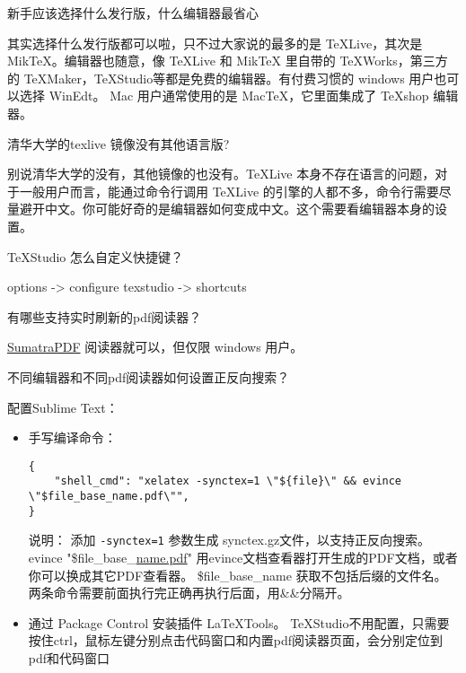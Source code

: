 \begin{faq}{新手应该选择什么发行版，什么编辑器最省心}

其实选择什么发行版都可以啦，只不过大家说的最多的是 TeXLive，其次是
MikTeX。编辑器也随意，像 TeXLive 和 MikTeX 里自带的 TeXWorks，第三方的
TeXMaker，TeXStudio等都是免费的编辑器。有付费习惯的 windows
用户也可以选择 WinEdt。 Mac 用户通常使用的是 MacTeX，它里面集成了
TeXshop 编辑器。
\end{faq}


\begin{faq}{清华大学的texlive 镜像没有其他语言版?}

别说清华大学的没有，其他镜像的也没有。TeXLive
本身不存在语言的问题，对于一般用户而言，能通过命令行调用 TeXLive
的引擎的人都不多，命令行需要尽量避开中文。你可能好奇的是编辑器如何变成中文。这个需要看编辑器本身的设置。
\end{faq}


\begin{faq}{TeXStudio 怎么自定义快捷键？}

options -\textgreater{} configure texstudio -\textgreater{} shortcuts
\end{faq}


\begin{faq}{有哪些支持实时刷新的pdf阅读器？}

\href{https://www.sumatrapdfreader.org/free-pdf-reader.html}{SumatraPDF}
阅读器就可以，但仅限 windows 用户。
\end{faq}


\begin{faq}{不同编辑器和不同pdf阅读器如何设置正反向搜索？}

配置Sublime Text：
\begin{itemize}
  \item
    手写编译命令：
\begin{verbatim}
{
    "shell_cmd": "xelatex -synctex=1 \"${file}\" && evince \"$file_base_name.pdf\"",
}
\end{verbatim}
    说明： 添加 \verb|-synctex=1| 参数生成
    synctex.gz文件，以支持正反向搜索。 evince
    "\$file\_base\_\href{http://name.pdf}{name.pdf}"
    用evince文档查看器打开生成的PDF文档，或者你可以换成其它PDF查看器。
    \$file\_base\_name 获取不包括后缀的文件名。
    两条命令需要前面执行完正确再执行后面，用\&\&分隔开。
  \item
    通过 Package Control 安装插件 LaTeXTools。
    TeXStudio不用配置，只需要按住ctrl，鼠标左键分别点击代码窗口和内置pdf阅读器页面，会分别定位到pdf和代码窗口
\end{itemize}
\end{faq}



